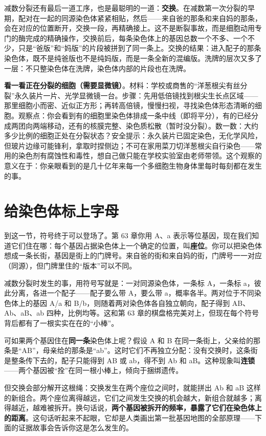 减数分裂还有最后一道工序，也是最聪明的一道：\textbf{交换}。在减数第一次分裂的早期，配对在一起的同源染色体紧紧相贴，然后——来自爸的那条和来自妈的那条，会在对应的位置断开，交换一段，再精确接上。这不是断裂事故，而是细胞动用专门的酶完成的精确操作，交换前后，每条染色体上的基因总数一个不多、一个不少，只是“爸版”和“妈版”的片段被拼到了同一条上。交换的结果：进入配子的那条染色体，既不是纯爸版也不是纯妈版，而是一条全新的混编版。洗牌的层次又多了一层：不只整染色体在洗牌，染色体内部的片段也在洗牌。

\begin{shiyan}
\textbf{看一看正在分裂的细胞（需要显微镜）}。材料：学校或商售的“洋葱根尖有丝分裂”永久装片一片、光学显微镜一台。步骤：先用低倍镜找到根尖生长点区域——那里细胞小而密、近似正方形；再转高倍镜，慢慢扫视，寻找染色体形态清晰的细胞。观察点：你会看到有的细胞里染色体排成一条中线（即将平分），有的已经分成两团向两端移动，还有的核膜完整、染色质松散（暂时没分裂）。数一数：大约多少比例的细胞正处在分裂状态？安全提示：永久装片已固定染色，无化学风险，但玻片边缘可能锋利，拿取时捏侧边；不可在家用菜刀切洋葱根尖自行染色——常用的染色剂有腐蚀性和毒性，想自己做只能在学校实验室由老师带领。这个观察的意义在于：你亲眼看到的是几十亿年来每一个多细胞生物身体里每时每刻都在发生的事。
\end{shiyan}

\section{给染色体标上字母}

到这一节，符号终于可以登场了。第 63 章你用 A、a 表示等位基因，现在我们知道它们住在哪：每个基因占据染色体上一个确定的位置，叫\textbf{座位}。你可以把染色体想成一条长街，基因是街上的门牌号。来自爸的街和来自妈的街，门牌号一一对应（同源），但门牌里住的“版本”可以不同。

减数分裂时发生的事，用符号写就是：一对同源染色体，一条标 A，一条标 a，彼此分离，各进一个配子——配子要么带 A，要么带 a，概率各半。两对位于不同染色体上的基因 A/a 和 B/b，则随着两对染色体各自独立朝向，配子得到 AB、Ab、aB、ab 四种，比例均等。这和第 63 章的棋盘格完美对上，但现在每个符号背后都有了一根实实在在的“小棒”。

可如果两个基因住在\textbf{同一条}染色体上呢？假设 A 和 B 在同一条街上，父亲给的那条是“AB”，母亲给的那条是“ab”。这时它们不再独立分配：没有交换时，这条街是整条传下去的，配子只能得到 AB 或 ab，得不到 Ab 和 aB。这种现象叫\textbf{连锁}——两个基因被“拴”在同一根小棒上，倾向于捆绑遗传。

但交换会部分解开这根绳：交换发生在两个座位之间时，就能拼出 Ab 和 aB 这样的新组合。两个座位离得越远，它们之间发生交换的机会越大，新组合就越多；离得越近，越难被拆开。换句话说，\textbf{两个基因被拆开的频率，暴露了它们在染色体上的距离}。这句话听起来不起眼，它却是人类画出第一批基因地图的全部原理——下面的证据故事会告诉你这是怎么发生的。


